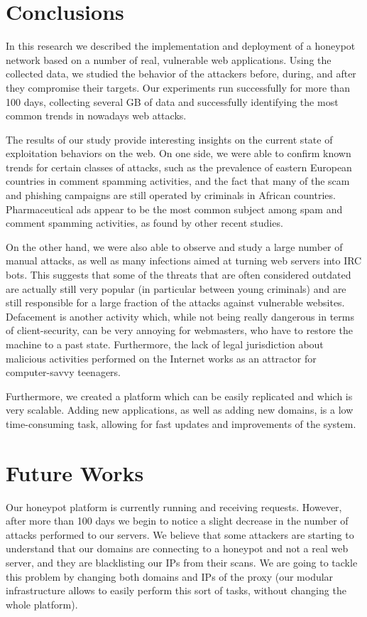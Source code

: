 \section{Conclusions}

In this research we described the implementation and deployment of a honeypot network based on a number of real, vulnerable web applications. Using the collected data, we studied the behavior of the attackers before, during, and after they compromise their targets. Our experiments run successfully for more than 100 days, collecting several GB of data and successfully identifying the most common trends in nowadays web attacks.

The results of our study provide interesting insights on the current state of exploitation behaviors on the web. On one side, we were able to confirm known trends for certain classes of attacks, such as the prevalence of eastern European countries in comment spamming activities, and the fact that many of the scam and phishing campaigns are still operated by criminals in African countries. Pharmaceutical ads appear to be the most common subject among spam and comment spamming activities, as found by other recent studies.

On the other hand, we were also able to observe and study a large number of manual attacks, as well as many infections aimed at turning web servers into IRC bots. This suggests that some of the threats that are often considered outdated are actually still very popular (in particular between young criminals) and are still responsible for a large fraction of the attacks against vulnerable websites. Defacement is another activity which, while not being really dangerous in terms of client-security, can be very annoying for webmasters, who have to restore the machine to a past state. Furthermore, the lack of legal jurisdiction about malicious activities performed on the Internet works as an attractor for computer-savvy teenagers.

Furthermore, we created a platform which can be easily replicated and which is very scalable. Adding new applications, as well as adding new domains, is a low time-consuming task, allowing for fast updates and improvements of the system.

\section{Future Works}

Our honeypot platform is currently running and receiving requests. However, after more than 100 days we begin to notice a slight decrease in the number of attacks performed to our servers. We believe that some attackers are starting to understand that our domains are connecting to a honeypot and not a real web server, and they are blacklisting our IPs from their scans. We are going to tackle this problem by changing both domains and IPs of the proxy (our modular infrastructure allows to easily perform this sort of tasks, without changing the whole platform).

